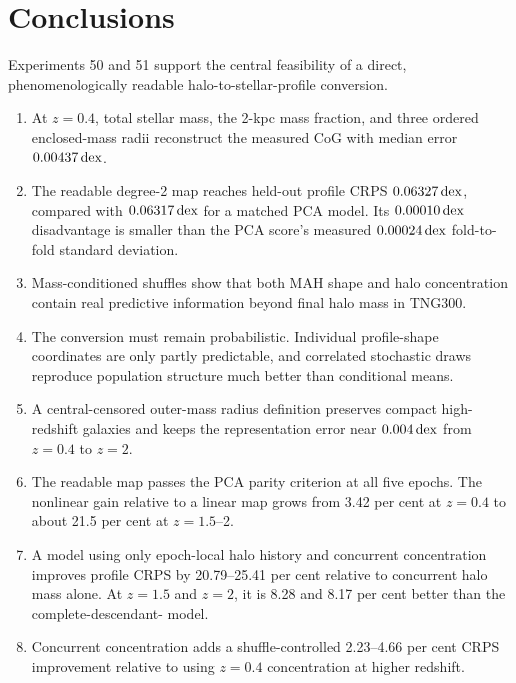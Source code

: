 \section{Conclusions}
\label{sec:conclusions}

Experiments 50 and 51 support the central feasibility of a direct,
phenomenologically readable halo-to-stellar-profile conversion.

\begin{enumerate}
  \item At $z=0.4$, total stellar mass, the 2-kpc mass fraction, and three
  ordered enclosed-mass radii reconstruct the measured CoG with median error
  $0.00437\,\mathrm{dex}$.

  \item The readable degree-2 map reaches held-out profile CRPS
  $0.06327\,\mathrm{dex}$, compared with $0.06317\,\mathrm{dex}$ for a matched PCA model. Its
  $0.00010\,\mathrm{dex}$ disadvantage is smaller than the PCA score's measured
  $0.00024\,\mathrm{dex}$ fold-to-fold standard deviation.

  \item Mass-conditioned shuffles show that both MAH shape and halo
  concentration contain real predictive information beyond final halo mass in
  TNG300.

  \item The conversion must remain probabilistic. Individual profile-shape
  coordinates are only partly predictable, and correlated stochastic draws
  reproduce population structure much better than conditional means.

  \item A central-censored outer-mass radius definition preserves compact
  high-redshift galaxies and keeps the representation error near $0.004\,\mathrm{dex}$
  from $z=0.4$ to $z=2$.

  \item The readable map passes the PCA parity criterion at all five epochs.
  The nonlinear gain relative to a linear map grows from 3.42 per cent at
  $z=0.4$ to about 21.5 per cent at $z=1.5$--2.

  \item A model using only epoch-local halo history and concurrent
  concentration improves profile CRPS by 20.79--25.41 per cent relative to
  concurrent halo mass alone. At $z=1.5$ and $z=2$, it is 8.28 and 8.17 per
  cent better than the complete-descendant-\diffmah{} model.

  \item Concurrent concentration adds a shuffle-controlled 2.23--4.66 per cent
  CRPS improvement relative to using $z=0.4$ concentration at higher redshift.


\end{enumerate}
